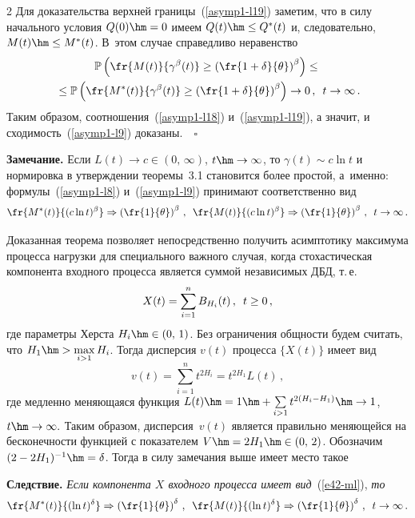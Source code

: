 \begin{multicols}{2}
Для доказательства верхней границы~(\ref{asymp1-l19}) заметим,
что в силу начального условия $Q(0)\hm=0$ имеем $Q(t)\hm \leq Q^*(t)$
и, следовательно, $M(t)\hm \leq M^*(t)$. В~этом случае справедливо неравенство
\begin{multline*}
\mathbb{P}\left( \fr{M(t)}{\gamma^\beta(t)}\geq
\left(\fr{1+\delta}{\theta}\right)^\beta\right) \leq{}\\
{}\leq \mathbb{P}\left(
\fr{M^*(t)}{\gamma^\beta(t)}\geq
\left(\fr{1+\delta}{\theta}\right)^\beta\right) \to 0\,,\enskip  t\to \infty\,.
\end{multline*}
Таким образом, соотношения~(\ref{asymp1-l18}) и~(\ref{asymp1-l19}),
а значит, и сходимость~(\ref{asymp1-l9})  доказаны.~\hfill~$\square$

\medskip


\noindent
\textbf{Замечание.}
Если $L(t) \to c\in (0,\,\infty)$, $t \hm\to \infty$,  то
$\gamma(t)\sim c \ln t$ и нормировка в утверждении теоремы~3.1
становится более простой, а~именно: формулы~(\ref{asymp1-l8})
и~(\ref{asymp1-l9}) принимают соответственно вид
$$
\fr{M^*(t)}{(c\ln t)^\beta} \Rightarrow
\left(\fr{1}{\theta}\right)^\beta\,,\enskip \fr{M(t)}{(c\ln
t)^\beta} \Rightarrow
\left(\fr{1}{\theta}\right)^\beta\,,\enskip t \to \infty\,.
$$

\smallskip

Доказанная теорема позволяет непосредственно  получить асимптотику
максимума процесса нагрузки для специального важного случая, когда
стохастическая компонента входного процесса является суммой
независимых ДБД, т.\,е.\
\begin{equation}
X(t)=\sum\limits_{i=1}^n B_{H_i}(t)\,,\enskip t\ge 0\,,
\label{e42-ml}
\end{equation}
где параметры Херста $H_i\hm\in (0,\,1)$.
 Без ограничения общности будем считать, что
$H_1\hm>\max\limits_{i>1}H_i$. Тогда  дисперсия $v(t)$  процесса $\{X(t)\}$  имеет вид
$$
v(t)=\sum\limits_{i=1}^n t^{2H_i}=t^{2H_1}L(t)\,,
$$
где медленно меняющаяся функция $ L(t)\hm=1\hm+\sum\limits_{i>1}
t^{2(H_i-H_1)}\hm\to 1$, $t \hm\to \infty. $ Таким образом,  дисперсия~$v(t)$ 
является правильно меняющейся на бесконечности функцией с
показателем $V\hm=2H_1\hm\in (0,\,2)$. Обозначим $ (2-2H_1)^{-1}\hm=\delta$.
Тогда в силу замечания выше имеет место такое

\smallskip

\noindent
\textbf{Следствие.}
\textit{Если компонента $X$  входного процесса имеет вид}~(\ref{e42-ml}), \textit{то}
$$
\fr{M^*(t)}{(\ln t)^\delta} \Rightarrow
\left(\fr{1}{\theta}\right)^{\delta}\,,\enskip \fr{M(t)}{(\ln
t)^\delta} \Rightarrow
\left(\fr{1}{\theta}\right)^\delta\,,\enskip t \to \infty\,.
$$


\end{multicols}
